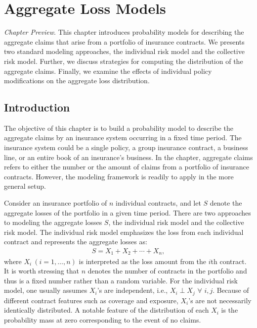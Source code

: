 \documentclass[]{book}
\theoremstyle{definition}
\theoremstyle{definition}
\theoremstyle{definition}
\theoremstyle{remark}
\begin{document}
\chapter{Aggregate Loss Models}\label{C:AggLossModels}

\emph{Chapter Preview}. This chapter introduces probability models for
describing the aggregate claims that arise from a portfolio of insurance
contracts. We presents two standard modeling approaches, the individual
risk model and the collective risk model. Further, we discuss strategies
for computing the distribution of the aggregate claims. Finally, we
examine the effects of individual policy modifications on the aggregate
loss distribution.

\section{Introduction}\label{introduction}

The objective of this chapter is to build a probability model to
describe the aggregate claims by an insurance system occurring in a
fixed time period. The insurance system could be a single policy, a
group insurance contract, a business line, or an entire book of an
insurance's business. In the chapter, aggregate claims refers to either
the number or the amount of claims from a portfolio of insurance
contracts. However, the modeling framework is readily to apply in the
more general setup.

Consider an insurance portfolio of \(n\) individual contracts, and let
\(S\) denote the aggregate losses of the portfolio in a given time
period. There are two approaches to modeling the aggregate losses \(S\),
the individual risk model and the collective risk model. The individual
risk model emphasizes the loss from each individual contract and
represents the aggregate losses as: \[\begin{aligned}
S=X_1 +X_2 +\cdots+X_n,
\end{aligned}\] where \(X_i~(i=1,\ldots,n)\) is interpreted as the loss
amount from the \(i\)th contract. It is worth stressing that \(n\)
denotes the number of contracts in the portfolio and thus is a fixed
number rather than a random variable. For the individual risk model, one
usually assumes \(X_{i}\)'s are independent, i.e., \(X_{i}\perp X_{j}\)
\(\forall\) \(i,j\). Because of different contract features such as
coverage and exposure, \(X_{i}\)'s are not necessarily identically
distributed. A notable feature of the distribution of each \(X_i\) is
the probability mass at zero corresponding to the event of no claims.
\end{document}

